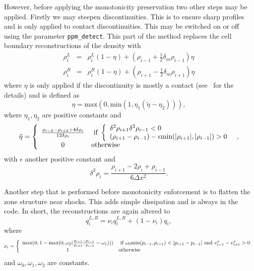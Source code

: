 \documentclass{article}
\begin{document}
However, before applying the monotonicity preservation two other steps
may be applied. Firstly we may steepen discontinuities. This is to
ensure sharp profiles and is only applied to contact
discontinuities. This may be switched on or off using the parameter
{\tt ppm\_detect}. This part of the method replaces the cell boundary
reconstructions of the density with
\begin{eqnarray}
  \label{eq:ppmdetect}
  \rho_i^L & = & \rho_i^L (1-\eta) + \left(\rho_{i-1} + \frac{1}{2}
    \delta_m \rho_{i-1} \right) \eta \\
  \rho_i^R & = & \rho_i^R (1-\eta) + \left(\rho_{i+1} - \frac{1}{2}
    \delta_m \rho_{i+1} \right) \eta
\end{eqnarray}
where $\eta$ is only applied if the discontinuity is mostly a contact
(see~\cite{ppm} for the details) and is defined as
\begin{equation}
  \label{eq:ppmeta}
  \eta = \textrm{max}(0, \textrm{min}(1, \eta_1 (\tilde{\eta} - \eta_2))),
\end{equation}
where $\eta_1,\eta_2$ are positive constants and
\begin{equation}
  \label{eq:ppmetatilde}
  \tilde{\eta} = \left\{ \begin{array}{c l} 
  \frac{\rho_{i-2} - \rho_{i+2} + 4 \delta\rho_i}{12\delta\rho_i} &
  \textrm{ if } \left\{
\begin{array}{l}
  \delta^2\rho_{i+1}\delta^2\rho_{i-1} < 0\\
  (\rho_{i+1} - \rho_{i-1}) - \epsilon \textrm{min}(|\rho_{i+1}|,|\rho_{i-1}|) >
  0\nonumber
\end{array} \right. \\
  0 & \textrm{otherwise} \end{array} \right.,
\end{equation}
with $\epsilon$ another positive constant and
\begin{equation}
  \label{eq:ppmd2rho}
  \delta^2\rho_i = \frac{\rho_{i+1} - 2\rho_i + \rho_{i-1}}{6\Delta
    x^2}.  
\end{equation}

Another step that is performed before monotonicity enforcement is to
flatten the zone structure near shocks. This adds simple dissipation
and is always in the code. In short, the reconstructions are again
altered to
\begin{equation}
  \label{eq:ppmflatten}
  q_i^{L,R} = \nu_i q_i^{L,R} + (1 - \nu_i) q_i,
\end{equation}
where
\begin{equation}
  \label{eq:ppmflatten2}
  \nu_i = \left\{ \begin{array}{c l} {\rm max}(0, 1 - \textrm{max}(0, \omega_2
      (\frac{p_{i+1} - p_{i-1}}{p_{i+2} - p_{i-2}} - \omega_1))) & \textrm{
        if } \omega_0 \textrm{min}(p_{i-1}, p_{i+1}) < |p_{i+1} - p_{i - 1}| 
      \textrm{ and } v^x_{i-1} - v^x_{i+1} > 0 \\
      1 & \textrm{otherwise} \end{array} \right.
\end{equation}
and $\omega_0, \omega_1,\omega_2$ are constants.
\end{document}
